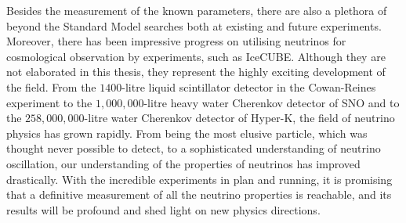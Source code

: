 Besides the measurement of the known parameters, there are also a plethora of beyond the Standard Model searches both at existing and future experiments.
Moreover, there has been impressive progress on utilising neutrinos for cosmological observation by experiments, such as IceCUBE.
Although they are not elaborated in this thesis, they represent the highly exciting development of the field.
From the $1400$-litre liquid scintillator detector in the Cowan-Reines experiment to the $1,000,000$-litre heavy water Cherenkov detector of SNO and to the $258,000,000$-litre water Cherenkov detector of Hyper-K, the field of neutrino physics has grown rapidly.
From being the most elusive particle, which was thought never possible to detect, to a sophisticated understanding of neutrino oscillation, our understanding of the properties of neutrinos has improved drastically.
With the incredible experiments in plan and running, it is promising that a definitive measurement of all the neutrino properties is reachable, and its results will be profound and shed light on new physics directions.

